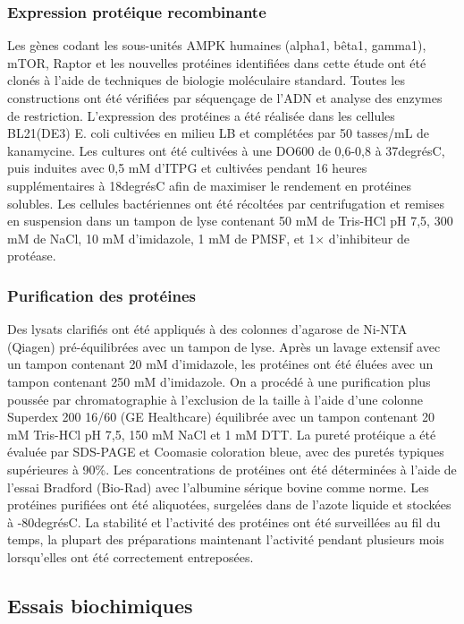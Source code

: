 \documentclass[11pt,a4paper]{article}
\begin{document}
\subsubsection{Expression protéique recombinante}

Les gènes codant les sous-unités AMPK humaines (alpha1, bêta1, gamma1), mTOR, Raptor et les nouvelles protéines identifiées dans cette étude ont été clonés à l'aide de techniques de biologie moléculaire standard. Toutes les constructions ont été vérifiées par séquençage de l'ADN et analyse des enzymes de restriction. L'expression des protéines a été réalisée dans les cellules BL21(DE3) E. coli cultivées en milieu LB et complétées par 50 tasses/mL de kanamycine. Les cultures ont été cultivées à une DO600 de 0,6-0,8 à 37degrésC, puis induites avec 0,5 mM d'ITPG et cultivées pendant 16 heures supplémentaires à 18degrésC afin de maximiser le rendement en protéines solubles. Les cellules bactériennes ont été récoltées par centrifugation et remises en suspension dans un tampon de lyse contenant 50 mM de Tris-HCl pH 7,5, 300 mM de NaCl, 10 mM d'imidazole, 1 mM de PMSF, et 1× d'inhibiteur de protéase.

\subsubsection{Purification des protéines}

Des lysats clarifiés ont été appliqués à des colonnes d'agarose de Ni-NTA (Qiagen) pré-équilibrées avec un tampon de lyse. Après un lavage extensif avec un tampon contenant 20 mM d'imidazole, les protéines ont été éluées avec un tampon contenant 250 mM d'imidazole. On a procédé à une purification plus poussée par chromatographie à l'exclusion de la taille à l'aide d'une colonne Superdex 200 16/60 (GE Healthcare) équilibrée avec un tampon contenant 20 mM Tris-HCl pH 7,5, 150 mM NaCl et 1 mM DTT. La pureté protéique a été évaluée par SDS-PAGE et Coomasie coloration bleue, avec des puretés typiques supérieures à 90\%. Les concentrations de protéines ont été déterminées à l'aide de l'essai Bradford (Bio-Rad) avec l'albumine sérique bovine comme norme. Les protéines purifiées ont été aliquotées, surgelées dans de l'azote liquide et stockées à -80degrésC. La stabilité et l'activité des protéines ont été surveillées au fil du temps, la plupart des préparations maintenant l'activité pendant plusieurs mois lorsqu'elles ont été correctement entreposées.

\subsection{Essais biochimiques}
\end{document}
